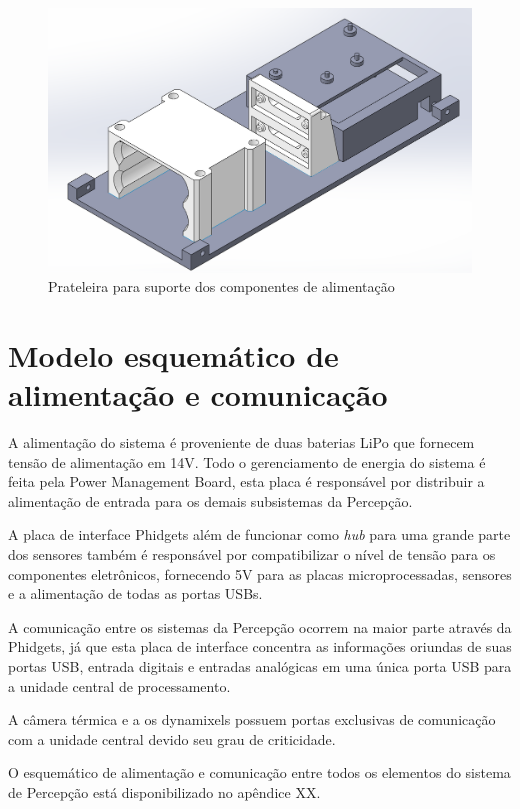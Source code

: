 \begin{figure}[H]
	\centering
	\includegraphics[width=14cm]{Figures/pecadebaixo.png}
	\caption{Prateleira para suporte dos componentes de alimentação} \label{pecaaliment}
\end{figure}

\section{Modelo esquemático de alimentação e comunicação}
\label{sec:modesq}

A alimentação do sistema é proveniente de duas baterias LiPo que fornecem tensão de alimentação em 14V. Todo o gerenciamento de energia do sistema é feita pela Power Management Board, esta placa é responsável por distribuir a alimentação de entrada para os demais subsistemas da Percepção. 

A placa de interface Phidgets além de funcionar como \textit{hub} para uma grande parte dos sensores também é responsável por compatibilizar o nível de tensão para os componentes eletrônicos, fornecendo 5V para as placas microprocessadas, sensores e a alimentação de todas as portas USBs. 

A comunicação entre os sistemas da Percepção ocorrem na maior parte  através da Phidgets, já que esta placa de interface concentra as informações oriundas de suas portas USB, entrada digitais e entradas analógicas em uma única porta USB para a unidade central de processamento.

 A câmera térmica e a os dynamixels possuem portas exclusivas de comunicação com a unidade central devido seu grau de criticidade.

O esquemático de alimentação e comunicação entre todos os elementos do sistema de Percepção está disponibilizado no apêndice XX.

